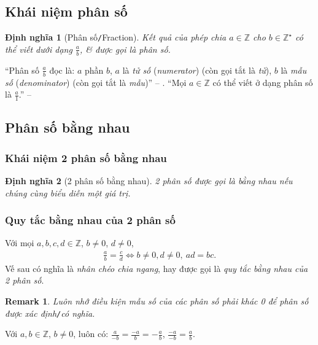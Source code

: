 \documentclass[oneside]{book}
\numberwithin{equation}{section}
\newtheorem{dinhnghia}{Định nghĩa}[section]
\newtheorem{remark}{Remark}[section]
\begin{document}
\subsection{Khái niệm phân số}

\begin{dinhnghia}[Phân số\texttt{/}Fraction]
	Kết quả của phép chia $a\in\mathbb{Z}$ cho $b\in\mathbb{Z}^\star$ có thể viết dưới dạng $\frac{a}{b}$, \textit{\&} được gọi là \emph{phân số}.
\end{dinhnghia}
``Phân số $\frac{a}{b}$ đọc là: $a$ phần $b$, $a$ là \textit{tử số} (\textit{numerator}) (còn gọi tắt là \textit{tử}), $b$ là \textit{mẫu số} (\textit{denominator}) (còn gọi tắt là \textit{mẫu})'' -- \cite[p.  25]{Thai_Anh_Dat_Ha_Loan_Nam_Quang_Toan_6_tap_2}. ``Mọi $a\in\mathbb{Z}$ có thể viết ở dạng phân số là $\frac{a}{1}$.'' -- \cite[p.  26]{Thai_Anh_Dat_Ha_Loan_Nam_Quang_Toan_6_tap_2}

\subsection{Phân số bằng nhau}

\subsubsection{Khái niệm 2 phân số bằng nhau}
\begin{dinhnghia}[2 phân số bằng nhau]
	2 phân số được gọi là \emph{bằng nhau} nếu chúng cùng biểu diễn một giá trị.
\end{dinhnghia}

\subsubsection{Quy tắc bằng nhau của 2 phân số}
Với mọi $a,b,c,d\in\mathbb{Z}$, $b\ne 0$, $d\ne 0$,
\begin{align*}
	\boxed{\frac{a}{b} = \frac{c}{d}\Leftrightarrow b\ne 0, d\ne 0,\ ad = bc.}
\end{align*}
Vế sau có nghĩa là \textit{nhân chéo chia ngang}, hay được gọi là \textit{quy tắc bằng nhau của 2 phân số}.

\begin{remark}
	Luôn nhớ điều kiện mẫu số của các phân số phải khác 0 để phân số được xác định\emph{\texttt{/}}có nghĩa.
\end{remark}
Với $a,b\in\mathbb{Z}$, $b\ne 0$, luôn có: $\frac{a}{-b} = \frac{-a}{b} = -\frac{a}{b}$, $\frac{-a}{-b} = \frac{a}{b}$.
\end{document}

